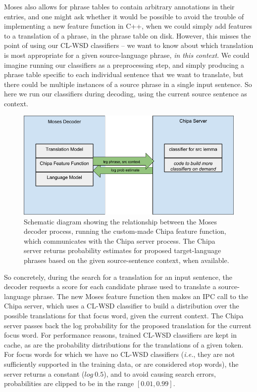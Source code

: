 Moses also allows for phrase tables to contain arbitrary annotations in their
entries, and one might ask whether it would be possible to avoid the
trouble of implementing a new feature function in C++, when we could simply
add features to a translation of a phrase, in the phrase table on disk.
However, this misses the point of using our CL-WSD classifiers -- we want to
know about which translation is most appropriate for a given source-language
phrase, \emph{in this context}. We could imagine running our classifiers as a
preprocessing step, and simply producing a phrase table specific to each
individual sentence that we want to translate, but there could be multiple
instances of a source phrase in a single input sentence. So here we run our
classifiers during decoding, using the current source sentence as context.

\begin{figure}
  \begin{centering}
  \includegraphics[width=15cm]{moses-chipa-diagram.png}
  \end{centering}
  \caption{Schematic diagram showing the relationship between the Moses decoder
  process, running the custom-made Chipa feature function, which communicates
  with the Chipa server process. The Chipa server returns probability
  estimates for proposed target-language phrases based on the given
  source-sentence context, when available.}
  \label{fig:moses-chipa-diagram}
\end{figure}

So concretely, during the search for a translation for an input sentence, the
decoder requests a score for each candidate phrase used to translate a
source-language phrase. The new Moses feature function then makes an IPC call
to the Chipa server, which uses a CL-WSD classifier to build a distribution
over the possible translations for that focus word, given the current context.
The Chipa server passes back the log probability for the proposed translation
for the current focus word. For performance reasons, trained CL-WSD classifiers
are kept in cache, as are the probability distributions for the translations of
a given token. For focus words for which we have no CL-WSD classifiers
(\emph{i.e.}, they are not sufficiently supported in the training data, or are
considered stop words), the server returns a constant ($log\ 0.5$), and to avoid
causing search errors, probabilities are clipped to be in the range $[0.01,
0.99]$.

